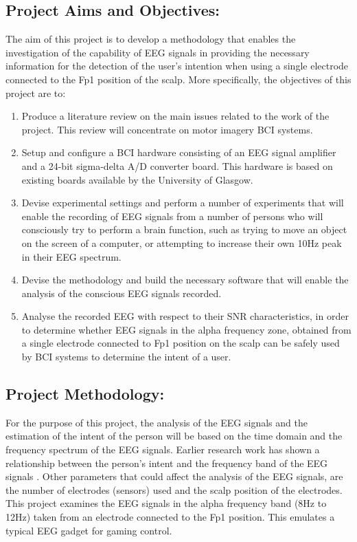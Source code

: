 \subsection{\bf{Project Aims and Objectives:}}
The aim of this project is to develop a methodology that enables the investigation of the capability of EEG signals in providing the necessary information for the detection of the user’s intention when using a single electrode connected to the Fp1 position of the scalp. More specifically, the objectives of this project are to:

\begin{enumerate}
	\item Produce a literature review on the main issues related to the work of the project. This review will concentrate on motor imagery BCI systems.
	\item	Setup and configure a BCI hardware consisting of an EEG signal amplifier and a 24-bit sigma-delta A/D converter board. This hardware is based on existing boards available by the University of Glasgow. 
	\item	Devise experimental settings and perform a number of experiments that will enable the recording of EEG signals from a number of persons who will consciously try to perform a brain function, such as trying to move an object on the screen of a computer, or attempting to increase their own 10Hz peak in their EEG spectrum. 
	\item	Devise the methodology and build the necessary software that will enable the analysis of the conscious EEG signals recorded.
	\item	Analyse the recorded EEG with respect to their SNR characteristics, in order to determine whether EEG signals in the alpha frequency zone, obtained from a single electrode connected to Fp1 position on the scalp can be safely used by BCI systems to determine the intent of a user. 
\end{enumerate}

\subsection{\bf{Project Methodology:}}
For the purpose of this project, the analysis of the EEG signals and the estimation of the intent of the person will be based on the time domain and the frequency spectrum of the EEG signals. Earlier research work has shown a relationship between the person’s intent and the frequency band of the EEG signals \citep{Wolpaw1991,Wolpaw2004}. Other parameters that could affect the analysis of the EEG signals, are the number of electrodes (sensors) used and the scalp position of the electrodes. This project examines the EEG signals in the alpha frequency band (8Hz to 12Hz) taken from an electrode connected to the Fp1 position. This emulates a typical EEG gadget for gaming control.

